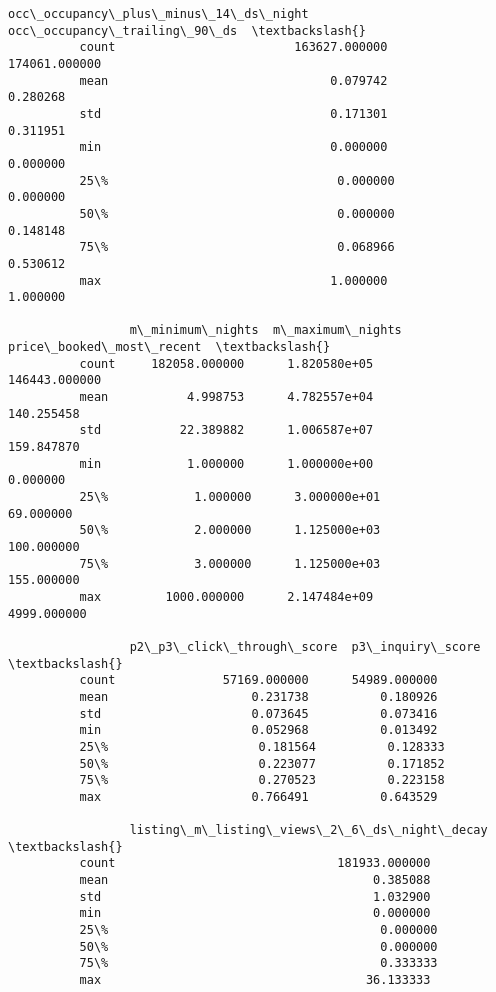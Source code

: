 \documentclass[11pt]{article}
\begin{document}
\begin{Verbatim}[commandchars=\\\{\}]
                 occ\_occupancy\_plus\_minus\_14\_ds\_night  occ\_occupancy\_trailing\_90\_ds  \textbackslash{}
          count                         163627.000000                 174061.000000   
          mean                               0.079742                      0.280268   
          std                                0.171301                      0.311951   
          min                                0.000000                      0.000000   
          25\%                                0.000000                      0.000000   
          50\%                                0.000000                      0.148148   
          75\%                                0.068966                      0.530612   
          max                                1.000000                      1.000000   
          
                 m\_minimum\_nights  m\_maximum\_nights  price\_booked\_most\_recent  \textbackslash{}
          count     182058.000000      1.820580e+05             146443.000000   
          mean           4.998753      4.782557e+04                140.255458   
          std           22.389882      1.006587e+07                159.847870   
          min            1.000000      1.000000e+00                  0.000000   
          25\%            1.000000      3.000000e+01                 69.000000   
          50\%            2.000000      1.125000e+03                100.000000   
          75\%            3.000000      1.125000e+03                155.000000   
          max         1000.000000      2.147484e+09               4999.000000   
          
                 p2\_p3\_click\_through\_score  p3\_inquiry\_score  \textbackslash{}
          count               57169.000000      54989.000000   
          mean                    0.231738          0.180926   
          std                     0.073645          0.073416   
          min                     0.052968          0.013492   
          25\%                     0.181564          0.128333   
          50\%                     0.223077          0.171852   
          75\%                     0.270523          0.223158   
          max                     0.766491          0.643529   
          
                 listing\_m\_listing\_views\_2\_6\_ds\_night\_decay  \textbackslash{}
          count                               181933.000000   
          mean                                     0.385088   
          std                                      1.032900   
          min                                      0.000000   
          25\%                                      0.000000   
          50\%                                      0.000000   
          75\%                                      0.333333   
          max                                     36.133333   
          

\end{Verbatim}
\end{document}
